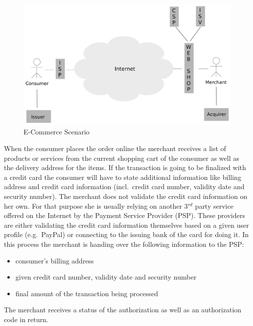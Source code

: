 \begin{figure}[H]
	\centering
		\includegraphics[width=0.8\columnwidth]{images/e-commerce-scenario.pdf}
	\caption{E-Commerce Scenario}
\label{fig:images_ecommerce_scenario}
\end{figure}

When the consumer places the order online the merchant receives a list of products or services from the current shopping cart of the consumer as well as the delivery address for the items.
If the transaction is going to be finalized with a credit card the consumer will have to state additional information like billing address and credit card information (incl.\ credit card number, validity date and security number).
The merchant does not validate the credit card information on her own. For that purpose she is usually relying on another 3$^{rd}$ party service offered on the Internet by the Payment Service Provider (PSP).
These providers are either validating the credit card information themselves based on a given user profile (e.g.\ PayPal) or connecting to the issuing bank of the card for doing it. In this process the merchant is
handing over the following information to the PSP:\@

\begin{itemize}
    \item consumer's billing address
    \item given credit card number, validity date and security number
    \item final amount of the transaction being processed
\end{itemize}

The merchant receives a status of the authorization as well as an authorization code in return.


